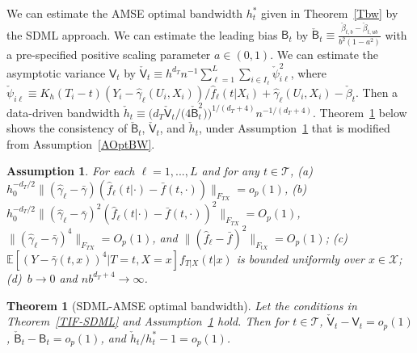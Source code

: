 \documentclass[lettersize, 12pt]{article}
\newtheorem{theorem}{Theorem}
\newtheorem{assumption}{Assumption}
\begin{document}
We can estimate the AMSE optimal bandwidth $h_t^\ast$ given in Theorem~\ref{Tbw} by the SDML approach. 
We can estimate the leading bias $\mathsf{B}_t$ by
$\check{\mathsf{B}}_t \equiv \frac{\check\beta_{t,b} - \check\beta_{t,ub}}{b^2 (1-a^2)}$
 with a pre-specified positive scaling parameter $a\in(0,1)$.
We can estimate the asymptotic variance $\mathsf{V}_t$ by $\check{\mathsf{V}}_t \equiv h^{d_T} n^{-1} \sum_{\ell=1}^L\sum_{i \in I_\ell} \check \psi_{i\ell}^2$, where 
$\check \psi_{i\ell} \equiv K_h(T_i-t) (Y_i - \hat \gamma_\ell(U_i,X_i) )/\hat f_\ell(t|X_i) +  \hat \gamma_\ell(U_i,X_i) - \check\beta_t$.
Then a data-driven bandwidth $\check h_t \equiv  \big(d_T \check{\mathsf{V}}_t\big/\big(4\check{\mathsf{B}}_t^2\big)\big)^{1/(d_T+4)} n^{-1/(d_T+4)}$.
Theorem~\ref{Tbw-SDML} below shows the consistency of $\check{\mathsf{B}}_t$, $\check{\mathsf{V}}_t$, and $\check h_t$, under Assumption~\ref{AOptBW-SDML} that is modified from Assumption~\ref{AOptBW}.

\begin{assumption}
For each $\ell=1,...,L$ and for any $t\in \mathcal{T}$, 
(a) $h_0^{-d_T/2}\|(\hat\gamma_\ell - \bar \gamma)(\hat f_\ell(t|\cdot) - \bar f(t,\cdot))\|_{F_{TX}}  = o_p(1)$, 
(b)~$h_0^{-d_T/2}\|(\hat\gamma_\ell - \bar \gamma)^2(\hat f_\ell(t|\cdot) - \bar f(t,\cdot))^2\|_{F_{TX}} = O_p(1)$, 
$\|(\hat\gamma_\ell - \bar \gamma)^4\|_{F_{TX}} = O_p(1)$, and 
$\|(\hat f_\ell - \bar f)^2\|_{F_{tX}} = O_p(1)$;
(c)~$\mathbb{E}[(Y-\bar \gamma(t, x))^4|T=t, X=x] f_{T|X}(t|x)$ is bounded uniformly over $x \in \mathcal{X}$;
(d)~$b\rightarrow 0$ and $nb^{d_T + 4} \rightarrow \infty$.
\label{AOptBW-SDML}
\end{assumption}


\begin{theorem}[SDML-AMSE optimal bandwidth]
Let the conditions in Theorem~\ref{TIF-SDML} and Assumption~\ref{AOptBW-SDML}  hold.
Then for $t\in\mathcal{T}$, 
$\check{\mathsf{V}}_t - \mathsf{V}_t = o_p(1)$, $\check{\mathsf{B}}_t - \mathsf{B}_t = o_p(1)$, and $\check h_t/h_t^\ast -1 = o_p(1)$.
\label{Tbw-SDML}
\end{theorem}
\end{document}
